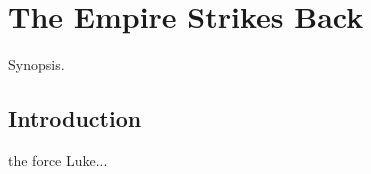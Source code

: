 \chapter{The Empire Strikes Back}
	\label{chapter:empire-strikes-back}%



\begin{synopsis}
	Synopsis.
\end{synopsis}


\section{Introduction}

 the force Luke...\cite{Salmon2006}

